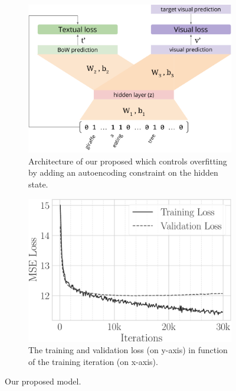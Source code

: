 \begin{figure}
\begin{subfigure}{0.53\linewidth}
\includegraphics[width=\linewidth]{s-t2v-arch}
\caption{Architecture of our proposed \sparsettv{} which controls overfitting by adding an autoencoding constraint on the hidden state.}
\label{fig:t2v:s-t2v:arch}
\end{subfigure}
\hfill
\begin{subfigure}{0.43\linewidth}
\includegraphics[width=\linewidth]{s-t2v-loss}
\caption{The training and validation loss (on y-axis) in function of the training iteration (on x-axis).}
\label{fig:t2v:s-t2v:loss}
\end{subfigure}
\caption{Our proposed \sparsettv{} model.}
\label{fig:t2v:s-t2v}
\end{figure}

